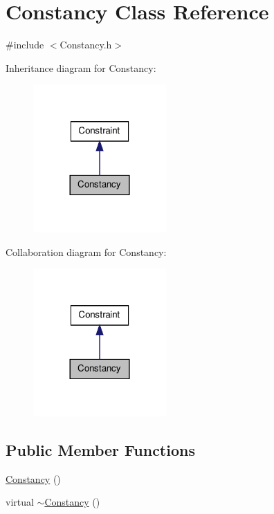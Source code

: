 \hypertarget{classConstancy}{\section{\-Constancy \-Class \-Reference}
\label{classConstancy}
}


{\ttfamily \#include $<$\-Constancy.\-h$>$}



\-Inheritance diagram for \-Constancy\-:\nopagebreak
\begin{figure}[H]
\begin{center}
\leavevmode
\includegraphics[width=144pt]{classConstancy__inherit__graph}
\end{center}
\end{figure}


\-Collaboration diagram for \-Constancy\-:\nopagebreak
\begin{figure}[H]
\begin{center}
\leavevmode
\includegraphics[width=144pt]{classConstancy__coll__graph}
\end{center}
\end{figure}
\subsection*{\-Public \-Member \-Functions}
\begin{DoxyCompactItemize}
\item 
\hyperlink{classConstancy_ae38922343ad8a98bd4e501e8ada5c83c}{\-Constancy} ()
\item 
virtual \hyperlink{classConstancy_a1cc620e04f04b406913bc60fd883bd66}{$\sim$\-Constancy} ()
\end{DoxyCompactItemize}
